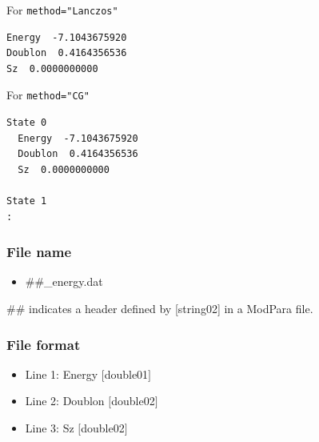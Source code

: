 For \verb|method="Lanczos"|

\begin{minipage}{12.5cm}
\begin{screen}
\begin{verbatim}
Energy  -7.1043675920 
Doublon  0.4164356536 
Sz  0.0000000000 
\end{verbatim}
\end{screen}
\end{minipage}

For \verb|method="CG"|

\begin{minipage}{12.5cm}
\begin{screen}
\begin{verbatim}
State 0
  Energy  -7.1043675920 
  Doublon  0.4164356536 
  Sz  0.0000000000 

State 1
:
\end{verbatim}
\end{screen}
\end{minipage}

\subsubsection{File name}
 \begin{itemize}
   \item  \#\#\_energy.dat
 \end{itemize}
 \#\# indicates a header defined by [string02] in a ModPara file.

\subsubsection{File format}
 \begin{itemize}
   \item Line 1: Energy $[$double01$]$
   \item Line 2: Doublon $[$double02$]$
   \item Line 3: Sz $[$double02$]$
  \end{itemize}
